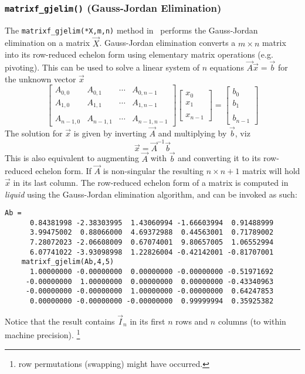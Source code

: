 \subsubsection{{\tt matrixf\_gjelim()} (Gauss-Jordan Elimination)}
\label{module:matrix:gjelim}
The {\tt matrixf\_gjelim(*X,m,n)} method in \liquid\
performs the Gauss-Jordan elimination on a matrix $\vec{X}$.
Gauss-Jordan elimination converts a $m \times n$ matrix into its
row-reduced echelon form using elementary matrix operations
(e.g. pivoting).
This can be used to solve a linear system of $n$ equations
$\vec{A}\vec{x} = \vec{b}$ for the unknown vector $\vec{x}$
\[
    \begin{bmatrix}
        A_{0,0}     & A_{0,1}   & \cdots  & A_{0,n-1} \\
        A_{1,0}     & A_{1,1}   & \cdots  & A_{1,n-1} \\
        \\
        A_{n-1,0}   & A_{n-1,1} & \cdots  & A_{n-1,n-1}
    \end{bmatrix}
    \begin{bmatrix}
        x_{0} \\
        x_{1} \\
        \\
        x_{n-1}
    \end{bmatrix}
    =
    \begin{bmatrix}
        b_{0} \\
        b_{1} \\
        \\
        b_{n-1}
    \end{bmatrix}
\]
The solution for $\vec{x}$ is given by inverting $\vec{A}$ and multiplying
by $\vec{b}$, viz
\[
    \vec{x} = \vec{A}^{-1}\vec{b}
\]
This is also equivalent to augmenting $\vec{A}$ with $\vec{b}$ and
converting it to its row-reduced echelon form.
If $\vec{A}$ is non-singular the resulting $n \times n+1$ matrix will hold
$\vec{x}$ in its last column.
The row-reduced echelon form of a matrix is computed in {\it liquid} using the
Gauss-Jordan elimination algorithm, and can be invoked as such:
\begin{Verbatim}[fontsize=\small]
    Ab =
      0.84381998 -2.38303995  1.43060994 -1.66603994  0.91488999
      3.99475002  0.88066000  4.69372988  0.44563001  0.71789002
      7.28072023 -2.06608009  0.67074001  9.80657005  1.06552994
      6.07741022 -3.93098998  1.22826004 -0.42142001 -0.81707001
    matrixf_gjelim(Ab,4,5)
      1.00000000 -0.00000000  0.00000000 -0.00000000 -0.51971692
     -0.00000000  1.00000000  0.00000000  0.00000000 -0.43340963
     -0.00000000 -0.00000000  1.00000000 -0.00000000  0.64247853
      0.00000000 -0.00000000 -0.00000000  0.99999994  0.35925382
\end{Verbatim}
Notice that the result contains $\vec{I}_n$ in its first $n$ rows and $n$
columns (to within machine precision).%
\footnote{row permutations (swapping) might have occurred.}

